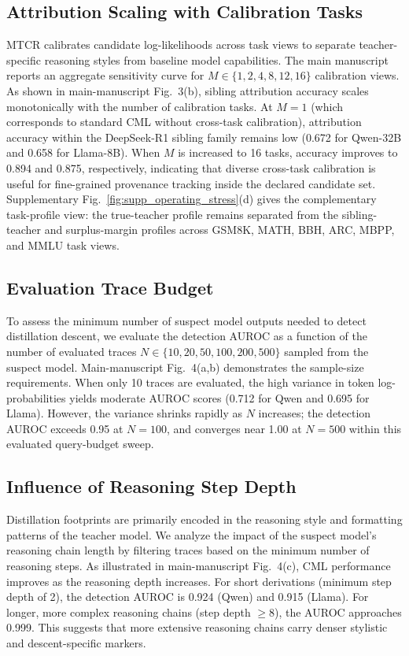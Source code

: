 \documentclass[onecolumn,journal]{IEEEtran}
\begin{document}
\subsection{Attribution Scaling with Calibration Tasks}
MTCR calibrates candidate log-likelihoods across task views to separate teacher-specific reasoning styles from baseline model capabilities. The main manuscript reports an aggregate sensitivity curve for $M \in \{1, 2, 4, 8, 12, 16\}$ calibration views.
As shown in main-manuscript Fig.~3(b), sibling attribution accuracy scales
monotonically with the number of calibration tasks. At $M=1$ (which corresponds to
standard CML without cross-task calibration), attribution accuracy within the
DeepSeek-R1 sibling family remains low (0.672 for Qwen-32B and 0.658 for Llama-8B).
When $M$ is increased to 16 tasks, accuracy improves to 0.894 and 0.875,
respectively, indicating that diverse cross-task calibration is useful for
fine-grained provenance tracking inside the declared candidate set. Supplementary
Fig.~\ref{fig:supp_operating_stress}(d) gives the complementary task-profile view:
the true-teacher profile remains separated from the sibling-teacher and surplus-margin
profiles across GSM8K, MATH, BBH, ARC, MBPP, and MMLU task views.

\subsection{Evaluation Trace Budget}
To assess the minimum number of suspect model outputs needed to detect distillation descent, we evaluate the detection AUROC as a function of the number of evaluated traces $N \in \{10, 20, 50, 100, 200, 500\}$ sampled from the suspect model.
Main-manuscript Fig.~4(a,b) demonstrates the sample-size requirements. When only 10
traces are evaluated, the high variance in token log-probabilities yields moderate
AUROC scores (0.712 for Qwen and 0.695 for Llama). However, the variance shrinks
rapidly as $N$ increases; the detection AUROC exceeds 0.95 at $N=100$, and converges
near 1.00 at $N=500$ within this evaluated query-budget sweep.

\subsection{Influence of Reasoning Step Depth}
Distillation footprints are primarily encoded in the reasoning style and formatting patterns of the teacher model. We analyze the impact of the suspect model's reasoning chain length by filtering traces based on the minimum number of reasoning steps.
As illustrated in main-manuscript Fig.~4(c), CML performance improves as the
reasoning depth increases. For short derivations (minimum step depth of 2), the
detection AUROC is 0.924 (Qwen) and 0.915 (Llama). For longer, more complex reasoning
chains (step depth $\ge 8$), the AUROC approaches 0.999. This suggests that more
extensive reasoning chains carry denser stylistic and descent-specific markers.
\end{document}

